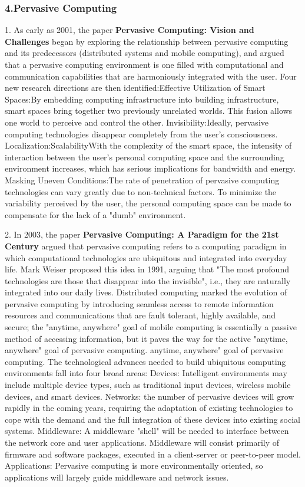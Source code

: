 \documentclass[a4paper,twoside]{scrbook}
\begin{document}
\begin{CJK}{UTF8}{gbsn}
\subsubsection{4.Pervasive Computing}

1. As early as 2001, the paper \textbf{Pervasive Computing: Vision and Challenges}\cite{satyanarayanan2001pervasive} began by exploring the relationship between pervasive computing and its predecessors (distributed systems and mobile computing), and argued that a pervasive computing environment is one filled with computational and communication capabilities that are harmoniously integrated with the user. Four new research directions are then identified:Effective Utilization of Smart Spaces:By embedding computing infrastructure into building infrastructure, smart spaces bring together two previously unrelated worlds. This fusion allows one world to perceive and control the other.
Invisibility:Ideally, pervasive computing technologies disappear completely from the user's consciousness.
Localization:ScalabilityWith the complexity of the smart space, the intensity of interaction between the user's personal computing space and the surrounding environment increases, which has serious implications for bandwidth and energy.
Masking Uneven Conditions:The rate of penetration of pervasive computing technologies can vary greatly due to non-technical factors. To minimize the variability perceived by the user, the personal computing space can be made to compensate for the lack of a "dumb" environment.


2. In 2003, the paper \textbf{Pervasive Computing: A Paradigm for the 21st Century}\cite{saha2003pervasive} argued that pervasive computing refers to a computing paradigm in which computational technologies are ubiquitous and integrated into everyday life. Mark Weiser proposed this idea in 1991, arguing that "The most profound technologies are those that disappear into the invisible", i.e., they are naturally integrated into our daily lives. Distributed computing marked the evolution of pervasive computing by introducing seamless access to remote information resources and communications that are fault tolerant, highly available, and secure; the "anytime, anywhere" goal of mobile computing is essentially a passive method of accessing information, but it paves the way for the active "anytime, anywhere" goal of pervasive computing. anytime, anywhere" goal of pervasive computing.
The technological advances needed to build ubiquitous computing environments fall into four broad areas:
Devices: Intelligent environments may include multiple device types, such as traditional input devices, wireless mobile devices, and smart devices.
Networks: the number of pervasive devices will grow rapidly in the coming years, requiring the adaptation of existing technologies to cope with the demand and the full integration of these devices into existing social systems.
Middleware: A middleware "shell" will be needed to interface between the network core and user applications. Middleware will consist primarily of firmware and software packages, executed in a client-server or peer-to-peer model.
Applications: Pervasive computing is more environmentally oriented, so applications will largely guide middleware and network issues.


\end{CJK}
\end{document}
